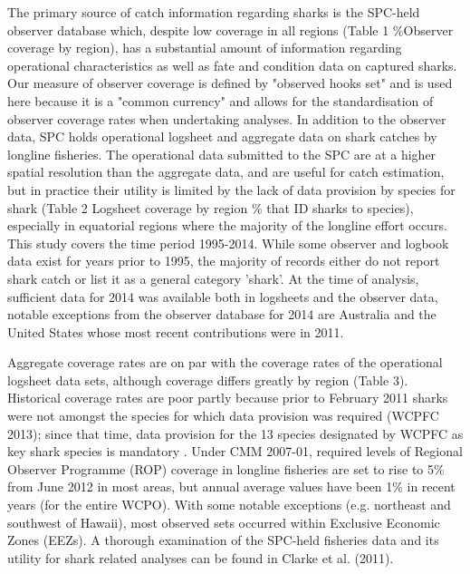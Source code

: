 \documentclass[12pt]{SCreport}
\begin{document}
The primary source of catch information regarding sharks is the SPC-held observer database which, despite low coverage in all regions (Table 1 \%Observer coverage by region), has a substantial amount of information regarding operational characteristics as well as fate and condition data on captured sharks. Our measure of observer coverage is defined by "observed hooks set" and is used here because it is a "common currency" and allows for the standardisation of observer coverage rates when undertaking analyses.  In addition to the observer data, SPC holds operational logsheet and aggregate data on shark catches by longline fisheries. The operational data submitted to the SPC are at a higher spatial resolution than the aggregate data, and are useful for catch estimation, but in practice their utility is limited by the lack of data provision by species for shark (Table 2 Logsheet coverage by region \% that ID sharks to species), especially in equatorial regions where the majority of the longline effort occurs. This study covers the time period 1995-2014. While some observer and logbook data exist for years prior to 1995, the majority of records either do not report shark catch or list it as a general category 'shark'.  At the time of analysis, sufficient data for 2014 was available both in logsheets and the observer data, notable exceptions from the observer database for 2014 are Australia and the United States whose most recent contributions were in 2011.

Aggregate coverage rates are on par with the coverage rates of the operational logsheet data sets, although coverage differs greatly by region (Table 3). Historical coverage rates are poor partly because prior to February 2011 sharks were not amongst the species for which data provision was required (WCPFC 2013); since that time, data provision for the 13 species designated by WCPFC as key shark species is mandatory . Under CMM 2007-01, required levels of Regional Observer Programme (ROP) coverage in longline fisheries are set to rise to 5\% from June 2012 in most areas, but annual average values have been 1\% in recent years (for the entire WCPO). With some notable exceptions (e.g. northeast and southwest of Hawaii), most observed sets occurred within Exclusive Economic Zones (EEZs). A thorough examination of the SPC-held fisheries data and its utility for shark related analyses can be found in Clarke et al. (2011).
\end{document}
